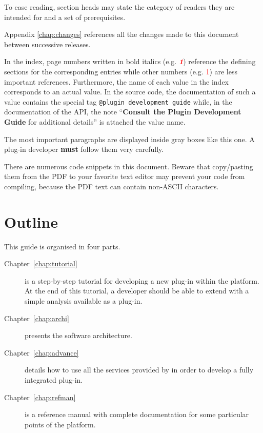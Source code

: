 To ease reading, section heads may state
the category of readers they are intended for and a set of prerequisites.

Appendix \ref{chap:changes} references all the changes made to
this document between successive \framac releases.

In the index, page numbers written in bold italics (e.g.  
\textcolor{red}{\textit{\textbf{1}}}) reference the defining sections for the
corresponding entries while other numbers (e.g. \textcolor{red}{1}) are
less important references. 
Furthermore, the name of each \caml value
in the index corresponds to an actual \framac value.
In the \framac source code, the
\ocamldoc documentation of such a value contains the special tag
\texttt{@plugin development guide} while, in the \html documentation of the
\framac API, the note ``\textbf{Consult the Plugin Development Guide} for
additional details'' is attached the value name.


\begin{important}
  The most important paragraphs are displayed inside gray boxes like this one.
  A plug-in developer \textbf{must} follow them very carefully.
\end{important}

\begin{important}
  There are numerous code snippets in this document. Beware that copy/pasting
  them from the PDF to your favorite text editor may prevent your code from
  compiling, because the PDF text can contain non-ASCII characters.
\end{important}

\section{Outline}

This guide is organised in four parts.

\begin{description}
\item[Chapter~\ref{chap:tutorial}] is a step-by-step tutorial for developing a
  new plug-in within the \framac platform. At the end of this tutorial, a
  developer should be able to extend \framac with a simple analysis available
  as a \framac plug-in. 
\item[Chapter~\ref{chap:archi}] presents the \framac software
  architecture. 
\item[Chapter~\ref{chap:advance}] details how to use all the services provided
  by \framac in order to develop a fully integrated plug-in. 
\item[Chapter~\ref{chap:refman}] is a reference manual with complete
  documentation for some particular points of the \framac platform.
\end{description}

